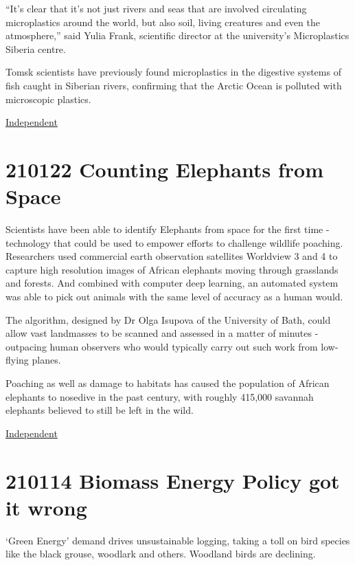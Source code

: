 \documentclass[
]{book}
\begin{document}
``It's clear that it's not just rivers and seas that are involved circulating microplastics around the world, but also soil, living creatures and even the atmosphere,'' said Yulia Frank, scientific director at the university's Microplastics Siberia centre.

Tomsk scientists have previously found microplastics in the digestive systems of fish caught in Siberian rivers, confirming that the Arctic Ocean is polluted with microscopic plastics.

\href{https://www.independent.co.uk/climate-change/news/microplastic-snow-siberia-pollution-b1819682.html}{Independent}

\hypertarget{counting-elephants-from-space}{%
\section{210122 Counting Elephants from Space}\label{counting-elephants-from-space}}

Scientists have been able to identify Elephants from space for the first time - technology that could be used to empower efforts to challenge wildlife poaching.
Researchers used commercial earth observation satellites Worldview 3 and 4 to capture high resolution images of African elephants moving through grasslands and forests.
And combined with computer deep learning, an automated system was able to pick out animals with the same level of accuracy as a human would.

The algorithm, designed by Dr Olga Isupova of the University of Bath, could allow vast landmasses to be scanned and assessed in a matter of minutes - outpacing human observers who would typically carry out such work from low-flying planes.

Poaching as well as damage to habitats has caused the population of African elephants to nosedive in the past century, with roughly 415,000 savannah elephants believed to still be left in the wild.

\href{https://www.independent.co.uk/environment/wildlife-trade-campaign-study-elephants-b1790797.html}{Independent}

\hypertarget{biomass-energy-policy-got-it-wrong}{%
\section{210114 Biomass Energy Policy got it wrong}\label{biomass-energy-policy-got-it-wrong}}

`Green Energy' demand drives unsustainable logging, taking a toll on bird species
like the black grouse, woodlark and others. Woodland birds are declining.
\end{document}
